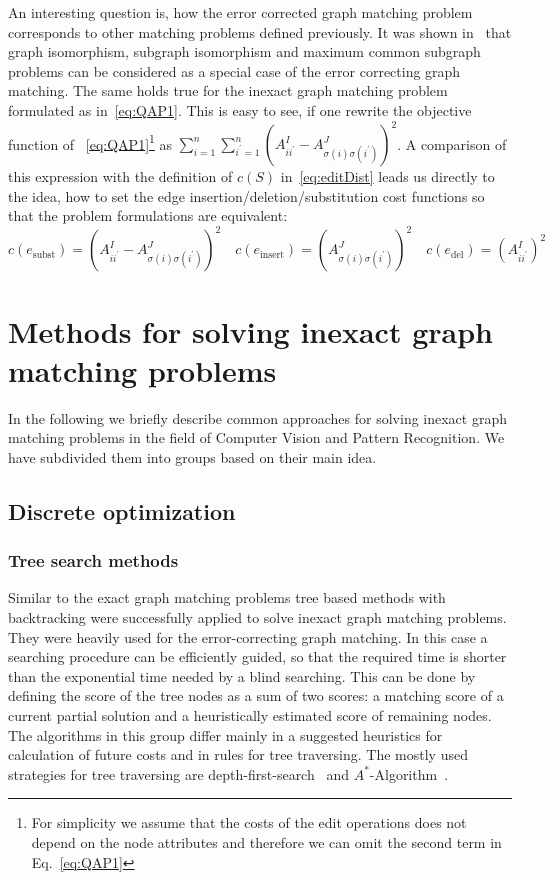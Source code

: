 An interesting question is, how the error corrected graph matching problem corresponds to other matching problems defined previously. It was shown in~\cite{Bunke1999_UnderlyingCosts} that graph isomorphism, subgraph isomorphism and maximum common subgraph problems can be considered as a special case of the error correcting graph matching. The same holds true for the inexact graph matching problem formulated as in~\eqref{eq:QAP1}. This is easy to see, if one rewrite the objective function of ~\eqref{eq:QAP1}\footnote{For simplicity we assume that the costs of the edit operations does not depend on the node attributes and therefore we can omit the second term in Eq.~\eqref{eq:QAP1}} as $\sum_{i=1}^n\sum_{i^\prime=1}^{n}(A^I_{ii^\prime}-A^J_{\sigma(i)\sigma(i^\prime)})^2$. A comparison of this expression with the definition of $c(S)$ in~\eqref{eq:editDist} leads us directly to the idea, how to set the edge insertion/deletion/substitution cost functions so that the problem formulations are equivalent: 
\begin{equation*}
c(e_{\text{subst}})=(A^I_{ii^\prime}-A^J_{\sigma(i)\sigma(i^\prime)})^2\quad c(e_{\text{insert}})=(A^J_{\sigma(i)\sigma(i^\prime)})^2\quad c(e_{\text{del}})=(A^I_{ii^\prime})^2
\end{equation*}
\section{Methods for solving inexact graph matching problems}
In the following we briefly describe common approaches for solving inexact graph matching problems in the field of Computer Vision and Pattern Recognition. We have subdivided them into groups based on their main idea.
\subsection{Discrete optimization}
\subsubsection{Tree search methods}
Similar to the exact graph matching problems tree based methods with backtracking were successfully applied to solve inexact graph matching problems. They were heavily used for the error-correcting graph matching. In this case a searching procedure can be efficiently guided, so that the required time is shorter than the exponential time needed by a blind searching. This can be done by defining the score of the tree nodes as a sum of two scores: a matching score of a current partial solution and a heuristically estimated score of remaining nodes. The algorithms in this group differ mainly in a suggested heuristics for calculation of future costs and in rules for tree traversing. The mostly used strategies for tree traversing are depth-first-search~\cite{Cormen} and $A^*$-Algorithm~\cite{AStar}.

